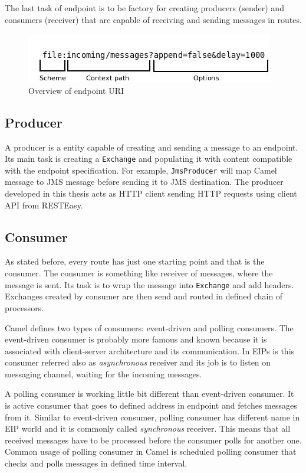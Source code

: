 \documentclass[12pt,final,oneside]{fithesis2}
\begin{document}
The last task of endpoint is to be factory for creating producers (sender) and consumers (receiver) that are capable of receiving and sending messages in routes.

\begin{figure}
\centering
\includegraphics[width=0.9\linewidth]{sources/Diagram1.jpeg}
\caption{Overview of endpoint URI}
\label{uri}
\end{figure}

\subsection*{Producer}
A producer is a entity capable of creating and sending a message to an endpoint. Its main task is creating a \texttt{Exchange} and populating it with content compatible with the endpoint specification. For example, \texttt{JmsProducer} will map Camel message to JMS message before sending it to JMS destination. The producer developed in this thesis acts as HTTP client sending HTTP requests using client API from RESTEasy.


\subsection*{Consumer} 
As stated before, every route has just one starting point and that is the consumer. The consumer is something like receiver of messages, where the message is sent. Its task is to wrap the message into \texttt{Exchange} and add headers. Exchanges created by consumer are then send and routed in defined chain of processors.

Camel defines two types of consumers: event-driven and polling consumers. The event-driven consumer is probably more famous and known because it is associated with client-server architecture and its communication. In EIPs is this consumer referred also as \textit{asynchronous} receiver and its job is to listen on messaging channel, waiting for the incoming messages.

A polling consumer is working little bit different than event-driven consumer. It is active consumer that goes to defined address in endpoint and fetches messages from it. Similar to event-driven consumer, polling consumer has different name in EIP world and it is commonly called \textit{synchronous} receiver. This means that all received messages have to be processed before the consumer polls for another one. Common usage of polling consumer in Camel is scheduled polling consumer that checks and polls messages in defined time interval.
\end{document}
